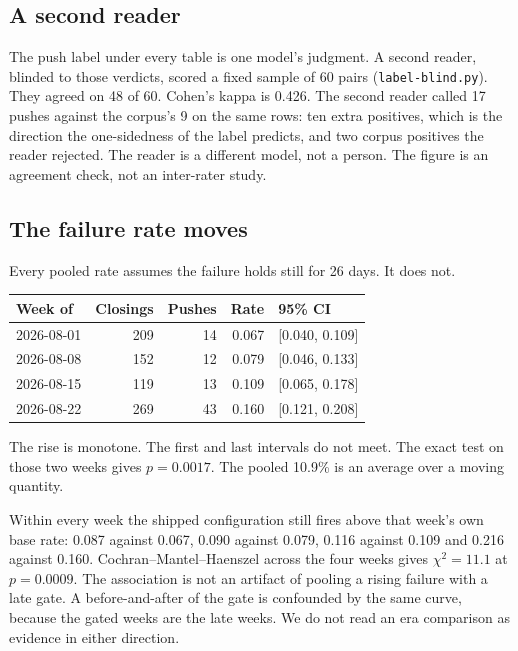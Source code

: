 \subsection{A second reader}
\label{sec:blind}

The push label under every table is one model's judgment. A second reader,
blinded to those verdicts, scored a fixed sample of 60 pairs
(\texttt{label-blind.py}). They agreed on 48 of 60. Cohen's kappa is 0.426.
The second reader called 17 pushes against the corpus's 9 on the same rows:
ten extra positives, which is the direction the one-sidedness of the label
predicts, and two corpus positives the reader rejected. The reader is a
different model, not a person. The figure is an agreement check, not an
inter-rater study.

\subsection{The failure rate moves}

Every pooled rate assumes the failure holds still for 26 days. It does not.

\begin{center}
\begin{tabular}{lrrrl}
\toprule
Week of & Closings & Pushes & Rate & 95\% CI \\
\midrule
2026-08-01 & 209 & 14 & 0.067 & [0.040, 0.109] \\
2026-08-08 & 152 & 12 & 0.079 & [0.046, 0.133] \\
2026-08-15 & 119 & 13 & 0.109 & [0.065, 0.178] \\
2026-08-22 & 269 & 43 & 0.160 & [0.121, 0.208] \\
\bottomrule
\end{tabular}
\end{center}

The rise is monotone. The first and last intervals do not meet. The exact
test on those two weeks gives $p = 0.0017$. The pooled 10.9\% is an average
over a moving quantity.

Within every week the shipped configuration still fires above that week's
own base rate: 0.087 against 0.067, 0.090 against 0.079, 0.116 against
0.109 and 0.216 against 0.160. Cochran--Mantel--Haenszel across the four
weeks gives $\chi^2 = 11.1$ at $p = 0.0009$. The association is not an
artifact of pooling a rising failure with a late gate. A before-and-after
of the gate is confounded by the same curve, because the gated weeks are
the late weeks. We do not read an era comparison as evidence in either
direction.

